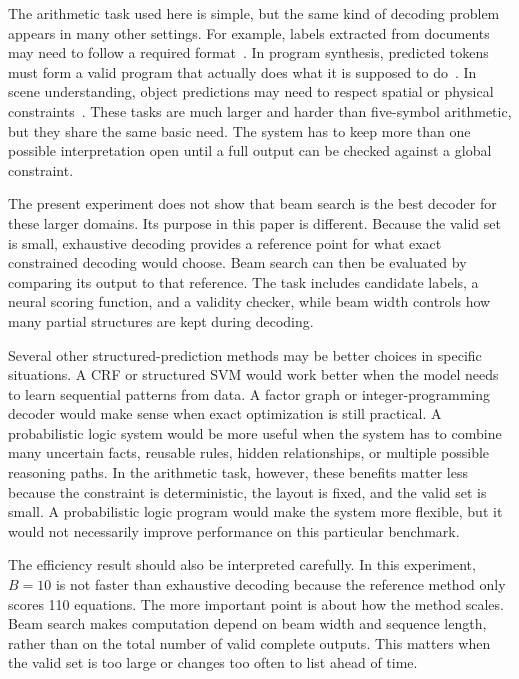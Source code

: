 \documentclass[12pt]{article}
\begin{document}
The arithmetic task used here is simple, but the same kind of decoding problem appears in many other settings. For example, labels extracted from documents may need to follow a required format~\cite{peng2006}. In program synthesis, predicted tokens must form a valid program that actually does what it is supposed to do~\cite{gulwani2017}. In scene understanding, object predictions may need to respect spatial or physical constraints~\cite{mao2019}. These tasks are much larger and harder than five-symbol arithmetic, but they share the same basic need. The system has to keep more than one possible interpretation open until a full output can be checked against a global constraint.

The present experiment does not show that beam search is the best decoder for these larger domains. Its purpose in this paper is different. Because the valid set is small, exhaustive decoding provides a reference point for what exact constrained decoding would choose. Beam search can then be evaluated by comparing its output to that reference. The task includes candidate labels, a neural scoring function, and a validity checker, while beam width controls how many partial structures are kept during decoding.

Several other structured-prediction methods may be better choices in specific situations. A CRF or structured SVM would work better when the model needs to learn sequential patterns from data. A factor graph or integer-programming decoder would make sense when exact optimization is still practical. A probabilistic logic system would be more useful when the system has to combine many uncertain facts, reusable rules, hidden relationships, or multiple possible reasoning paths. In the arithmetic task, however, these benefits matter less because the constraint is deterministic, the layout is fixed, and the valid set is small. A probabilistic logic program would make the system more flexible, but it would not necessarily improve performance on this particular benchmark.

The efficiency result should also be interpreted carefully. In this experiment, $B=10$ is not faster than exhaustive decoding because the reference method only scores 110 equations. The more important point is about how the method scales. Beam search makes computation depend on beam width and sequence length, rather than on the total number of valid complete outputs. This matters when the valid set is too large or changes too often to list ahead of time.
\end{document}
